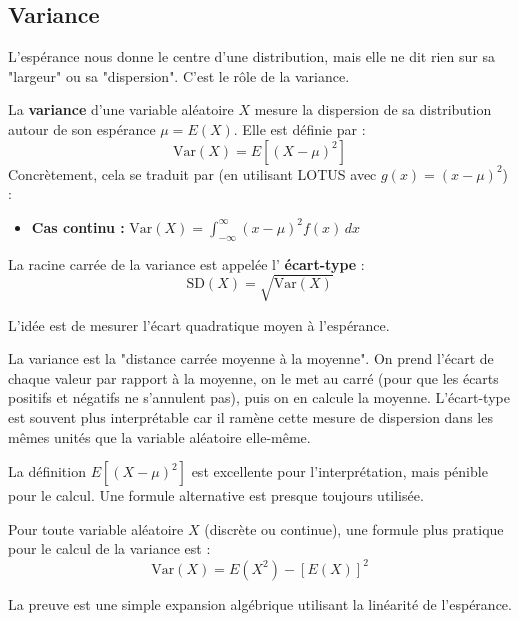 \subsection{Variance}

L'espérance nous donne le centre d'une distribution, mais elle ne dit rien sur sa "largeur" ou sa "dispersion". C'est le rôle de la variance.

\begin{definitionbox}
La \textbf{variance} d'une variable aléatoire $X$ mesure la dispersion de sa distribution autour de son espérance $\mu = E(X)$. Elle est définie par :
$$\text{Var}(X) = E\left[ (X - \mu)^2 \right]$$
Concrètement, cela se traduit par (en utilisant LOTUS avec $g(x)=(x-\mu)^2$) :
\begin{itemize}
    \item \textbf{Cas continu :} $\text{Var}(X) = \int_{-\infty}^{\infty} (x - \mu)^2 f(x) \, dx$
\end{itemize}
La racine carrée de la variance est appelée l' \textbf{écart-type} :
$$\text{SD}(X) = \sqrt{\text{Var}(X)}$$
\end{definitionbox}

L'idée est de mesurer l'écart quadratique moyen à l'espérance.

\begin{intuitionbox}
La variance est la "distance carrée moyenne à la moyenne". On prend l'écart de chaque valeur par rapport à la moyenne, on le met au carré (pour que les écarts positifs et négatifs ne s'annulent pas), puis on en calcule la moyenne. L'écart-type est souvent plus interprétable car il ramène cette mesure de dispersion dans les mêmes unités que la variable aléatoire elle-même.
\end{intuitionbox}

La définition $E[(X-\mu)^2]$ est excellente pour l'interprétation, mais pénible pour le calcul. Une formule alternative est presque toujours utilisée.

\begin{theorembox}
Pour toute variable aléatoire $X$ (discrète ou continue), une formule plus pratique pour le calcul de la variance est :
$$\text{Var}(X) = E(X^2) - [E(X)]^2$$
\end{theorembox}

La preuve est une simple expansion algébrique utilisant la linéarité de l'espérance.

